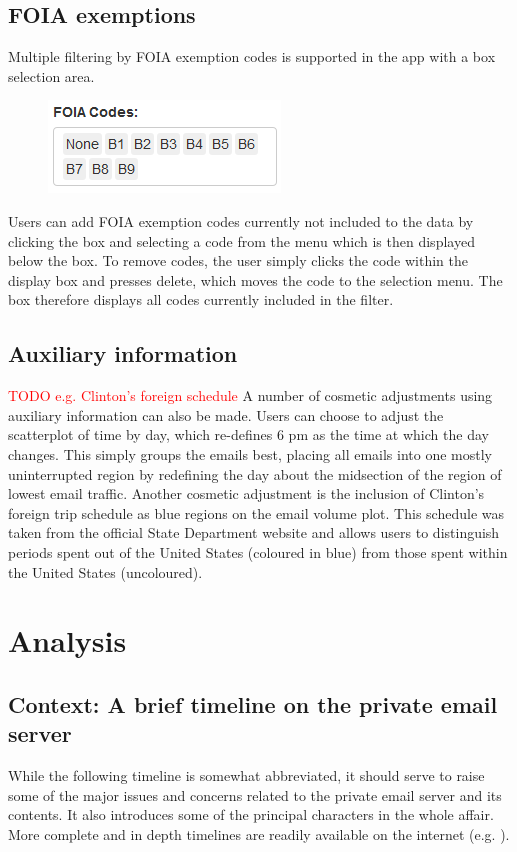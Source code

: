 \documentclass[journal]{vgtc}                %
\newcommand*{\TODO}[1]{\textcolor{red}{TODO #1}}
\begin{document}
\subsection{FOIA exemptions}
Multiple filtering by FOIA exemption codes is supported in the app with a box selection area. 
\begin{figure}[h]
\begin{center}
\includegraphics[width=0.35\linewidth]{FOIABoxImage}
\end{center}
\end{figure}
Users can add FOIA exemption codes currently not included to the data by clicking the box and selecting a code from the menu which is then displayed below the box. To remove codes, the user simply clicks the code within the display box and presses delete, which moves the code to the selection menu. The box therefore displays all codes currently included in the filter.
\subsection{Auxiliary information}
\TODO{e.g. Clinton's foreign schedule}
A number of cosmetic adjustments using auxiliary information can also be made. Users can choose to adjust the scatterplot of time by day, which re-defines 6 pm as the time at which the day changes. This simply groups the emails best, placing all emails into one mostly uninterrupted region by redefining the day about the midsection of the region of lowest email traffic. Another cosmetic adjustment is the inclusion of Clinton's foreign trip schedule as blue regions on the email volume plot. This schedule was taken from the official State Department website \cite{ForeignSched} and allows users to distinguish periods spent out of the United States (coloured in blue) from those spent within the United States (uncoloured).

\section{Analysis}
\label{sect:Analysis}

\subsection{Context: A brief timeline on the private email server}
\label{sect:Analysis:Timeline}
While the following timeline is somewhat abbreviated, it should serve to raise some of the major issues and concerns related to the private email server and its contents.  It also introduces some of the principal characters in the whole affair.  More complete and in depth timelines are readily available on the internet (e.g. \cite{attkissonTimeline, thompsonTimeline, WashPostTimeline, clintonWikipedia, TimeMagEverything}).
\end{document}
